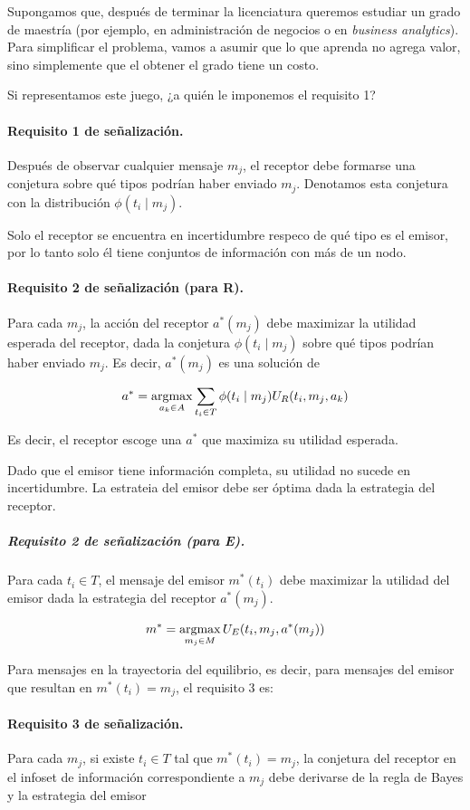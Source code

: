 \documentclass[12pt]{article}
\begin{document}
Supongamos que, después de terminar la licenciatura queremos estudiar un grado de maestría (por ejemplo, en administración de negocios o en \textit{business analytics}). Para simplificar el problema, vamos a asumir que lo que aprenda no agrega valor, sino simplemente que el obtener el grado tiene un costo. 

Si representamos este juego, ¿a quién le imponemos el requisito 1?

\paragraph{Requisito 1 de señalización.} Después de observar cualquier mensaje $ m_j $, el receptor debe formarse una conjetura sobre qué tipos podrían haber enviado $ m_j $. Denotamos esta conjetura con la distribución $ \phi(t_i \mid m_j) $.

Solo el receptor se encuentra en incertidumbre respeco de qué tipo es el emisor, por lo tanto solo él tiene conjuntos de información con más de un nodo.

\paragraph{Requisito 2 de señalización (para R).} Para cada $ m_j $, la acción del receptor $ a^*(m_j) $ debe maximizar la utilidad esperada del receptor, dada la conjetura $ \phi(t_i\mid m_j) $ sobre qué tipos podrían haber enviado $ m_j $. Es decir, $ a^*(m_j) $ es una solución de 

\[a^* = \operatorname*{argmax}_{a_k \in A} \sum_{t_i\in T}\phi(t_i \mid m_j)U_R(t_i, m_j, a_k)\]

Es decir, el receptor escoge una $ a^* $ que maximiza su utilidad esperada.

Dado que el emisor tiene información completa, su utilidad no sucede en incertidumbre. La estrateia del emisor debe ser óptima dada la estrategia del receptor.

\subparagraph{Requisito 2 de señalización (para E).} Para cada $ t_i \in T $, el mensaje del emisor $ m^*(t_i) $ debe maximizar la utilidad del emisor dada la estrategia del receptor $ a^*(m_j) $. 

\[m^* = \operatorname*{argmax}_{m_j \in M} U_E(t_i, m_j, a^*(m_j))\]

Para mensajes en la trayectoria del equilibrio, es decir, para mensajes del emisor que resultan en $ m^*(t_i) = m_j $, el requisito 3 es:

\paragraph{Requisito 3 de señalización.} Para cada $ m_j $, si existe $ t_i \in T$ tal que $ m^*(t_i) = m_j $, la conjetura del receptor en el infoset de información correspondiente a $ m_j $ debe derivarse de la regla de Bayes y la estrategia del emisor
\end{document}
